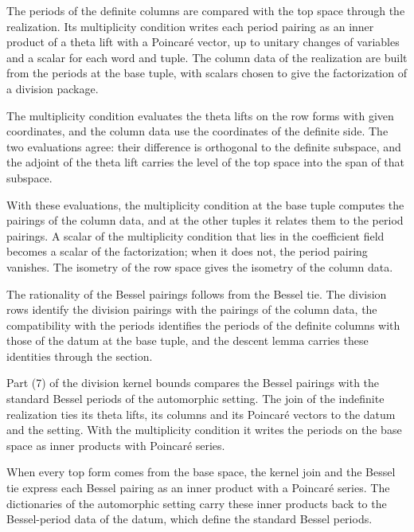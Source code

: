 The periods of the definite columns are compared with the top space through
the realization. Its multiplicity condition writes each period pairing as an
inner product of a theta lift with a Poincaré vector, up to unitary changes of
variables and a scalar for each word and tuple. The column data of the
realization are built from the periods at the base tuple, with scalars chosen
to give the factorization of a division package.

The multiplicity condition evaluates the theta lifts on the row forms with
given coordinates, and the column data use the coordinates of the definite
side. The two evaluations agree: their difference is orthogonal to the
definite subspace, and the adjoint of the theta lift carries the level of the
top space into the span of that subspace.

With these evaluations, the multiplicity condition at the base tuple computes
the pairings of the column data, and at the other tuples it relates them to
the period pairings. A scalar of the multiplicity condition that lies in the
coefficient field becomes a scalar of the factorization; when it does not, the
period pairing vanishes. The isometry of the row space gives the isometry of
the column data.

The rationality of the Bessel pairings follows from the Bessel tie. The
division rows identify the division pairings with the pairings of the column
data, the compatibility with the periods identifies the periods of the
definite columns with those of the datum at the base tuple, and the descent
lemma carries these identities through the section.

Part (7) of the division kernel bounds compares the Bessel pairings with the
standard Bessel periods of the automorphic setting. The join of the indefinite
realization ties its theta lifts, its columns and its Poincaré vectors to the
datum and the setting. With the multiplicity condition it writes the periods
on the base space as inner products with Poincaré series.

When every top form comes from the base space, the kernel join and the Bessel
tie express each Bessel pairing as an inner product with a Poincaré series.
The dictionaries of the automorphic setting carry these inner products back
to the Bessel-period data of the datum, which define the standard Bessel
periods.

